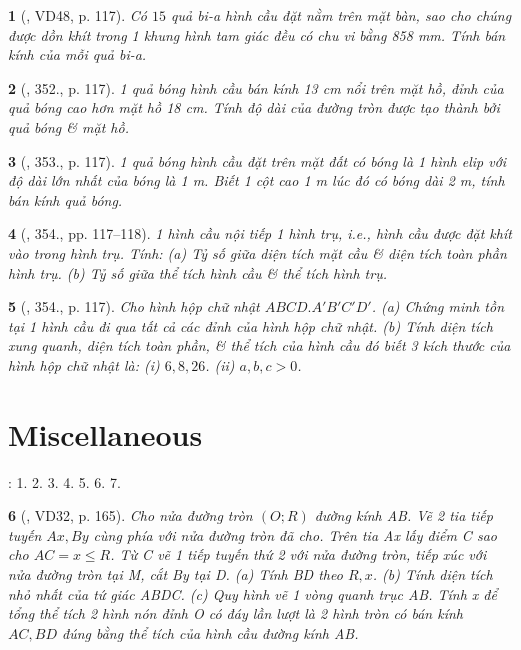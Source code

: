 \documentclass{article}
\newtheorem{baitoan}{}
\begin{document}
\begin{baitoan}[\cite{Binh_Toan_9_tap_2}, VD48, p. 117]
	Có $15$ quả bi-a hình cầu đặt nằm trên mặt bàn, sao cho chúng được dồn khít trong 1 khung hình tam giác đều có chu vi bằng {\rm858 mm}. Tính bán kính của mỗi quả bi-a.
\end{baitoan}

\begin{baitoan}[\cite{Binh_Toan_9_tap_2}, 352., p. 117]
	1 quả bóng hình cầu bán kính {\rm13 cm} nổi trên mặt hồ, đỉnh của quả bóng cao hơn mặt hồ {\rm18 cm}. Tính độ dài của đường tròn được tạo thành bởi quả bóng \& mặt hồ.
\end{baitoan}

\begin{baitoan}[\cite{Binh_Toan_9_tap_2}, 353., p. 117]
	1 quả bóng hình cầu đặt trên mặt đất có bóng là 1 hình elip với độ dài lớn nhất của bóng là {\rm1 m}. Biết 1 cột cao {\rm1 m} lúc đó có bóng dài {\rm2 m}, tính bán kính quả bóng.
\end{baitoan}

\begin{baitoan}[\cite{Binh_Toan_9_tap_2}, 354., pp. 117--118]
	1 hình cầu nội tiếp 1 hình trụ, i.e., hình cầu được đặt khít vào trong hình trụ. Tính: (a) Tỷ số giữa diện tích mặt cầu \& diện tích toàn phần hình trụ. (b) Tỷ số giữa thể tích hình cầu \& thể tích hình trụ.
\end{baitoan}

\begin{baitoan}[\cite{Binh_Toan_9_tap_2}, 354., p. 117]
	Cho hình hộp chữ nhật $ABCD.A'B'C'D'$. (a) Chứng minh tồn tại 1 hình cầu đi qua tất cả các đỉnh của hình hộp chữ nhật. (b) Tính diện tích xung quanh, diện tích toàn phần, \& thể tích của hình cầu đó biết 3 kích thước của hình hộp chữ nhật là: (i) $6,8,26$. (ii) $a,b,c > 0$.
\end{baitoan}


\section{Miscellaneous}
\cite[BTCCX, pp. 109--110]{SGK_Toan_9_Canh_Dieu_tap_1}: 1. 2. 3. 4. 5. 6. 7.

\begin{baitoan}[\cite{Tuyen_Toan_9_old}, VD32, p. 165]
	Cho nửa đường tròn $(O;R)$ đường kính AB. Vẽ 2 tia tiếp tuyến $Ax,By$ cùng phía với nửa đường tròn đã cho. Trên tia Ax lấy điểm C sao cho $AC = x\le R$. Từ C vẽ 1 tiếp tuyến thứ 2 với nửa đường tròn, tiếp xúc với nửa đường tròn tại M, cắt By tại D. (a) Tính BD theo $R,x$. (b) Tính diện tích nhỏ nhất của tứ giác ABDC. (c) Quy hình vẽ 1 vòng quanh trục AB. Tính x để tổng thể tích 2 hình nón đỉnh O có đáy lần lượt là 2 hình tròn có bán kính $AC,BD$ đúng bằng thể tích của hình cầu đường kính AB.
\end{baitoan}
\end{document}
